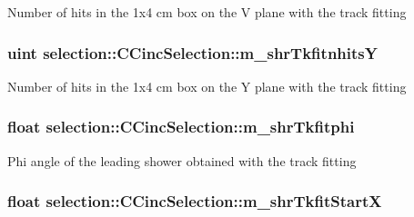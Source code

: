 Number of hits in the 1x4 cm box on the V plane with the track fitting \hypertarget{classselection_1_1CCincSelection_a63f55e51e3df0e108aace93b3c34c153}{
\subsubsection[{m\-\_\-shr\-Tkfitnhits\-Y}]{\setlength{\rightskip}{0pt plus 5cm}uint selection\-::\-C\-Cinc\-Selection\-::m\-\_\-shr\-Tkfitnhits\-Y\hspace{0.3cm}{\ttfamily [private]}}}\label{classselection_1_1CCincSelection_a63f55e51e3df0e108aace93b3c34c153}
Number of hits in the 1x4 cm box on the Y plane with the track fitting \hypertarget{classselection_1_1CCincSelection_af760bcbc586c53183f9ed2d5359b028a}{
\subsubsection[{m\-\_\-shr\-Tkfitphi}]{\setlength{\rightskip}{0pt plus 5cm}float selection\-::\-C\-Cinc\-Selection\-::m\-\_\-shr\-Tkfitphi\hspace{0.3cm}{\ttfamily [private]}}}\label{classselection_1_1CCincSelection_af760bcbc586c53183f9ed2d5359b028a}
Phi angle of the leading shower obtained with the track fitting \hypertarget{classselection_1_1CCincSelection_a0bab1ed8cdf12861136bd47a6d48c7ad}{
\subsubsection[{m\-\_\-shr\-Tkfit\-Start\-X}]{\setlength{\rightskip}{0pt plus 5cm}float selection\-::\-C\-Cinc\-Selection\-::m\-\_\-shr\-Tkfit\-Start\-X\hspace{0.3cm}{\ttfamily [private]}}}\label{classselection_1_1CCincSelection_a0bab1ed8cdf12861136bd47a6d48c7ad}
